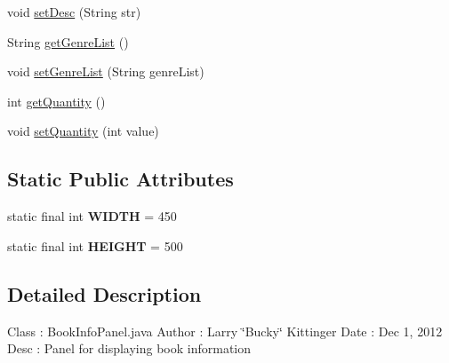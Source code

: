 \begin{DoxyCompactItemize}
\item 
void \hyperlink{classw3se_1_1_view_1_1_subpanels_1_1_book_info_panel_a6c6b9bc0ab79bbca7e6e3536c134b820}{set\-Desc} (String str)
\item 
String \hyperlink{classw3se_1_1_view_1_1_subpanels_1_1_book_info_panel_afed42bdaabfb5d91aa16bead3d5fa355}{get\-Genre\-List} ()
\item 
void \hyperlink{classw3se_1_1_view_1_1_subpanels_1_1_book_info_panel_acfaac84cb7cf802a5ad53ac779e92284}{set\-Genre\-List} (String genre\-List)
\item 
int \hyperlink{classw3se_1_1_view_1_1_subpanels_1_1_book_info_panel_a3085931038f240483d0e56ac7a090795}{get\-Quantity} ()
\item 
void \hyperlink{classw3se_1_1_view_1_1_subpanels_1_1_book_info_panel_a71d9f7f17b658a69f7c51e4896746994}{set\-Quantity} (int value)
\end{DoxyCompactItemize}
\subsection*{Static Public Attributes}
\begin{DoxyCompactItemize}
\item 
\hypertarget{classw3se_1_1_view_1_1_subpanels_1_1_book_info_panel_af29607c3b4e6c682527dce4562562afa}{static final int {\bfseries W\-I\-D\-T\-H} = 450}\label{classw3se_1_1_view_1_1_subpanels_1_1_book_info_panel_af29607c3b4e6c682527dce4562562afa}

\item 
\hypertarget{classw3se_1_1_view_1_1_subpanels_1_1_book_info_panel_a5e5262dfc7629f29ac82d59eca379a54}{static final int {\bfseries H\-E\-I\-G\-H\-T} = 500}\label{classw3se_1_1_view_1_1_subpanels_1_1_book_info_panel_a5e5262dfc7629f29ac82d59eca379a54}

\end{DoxyCompactItemize}


\subsection{Detailed Description}
Class \-: Book\-Info\-Panel.\-java Author \-: Larry \char`\"{}\-Bucky\char`\"{} Kittinger Date \-: Dec 1, 2012 Desc \-: Panel for displaying book information 

